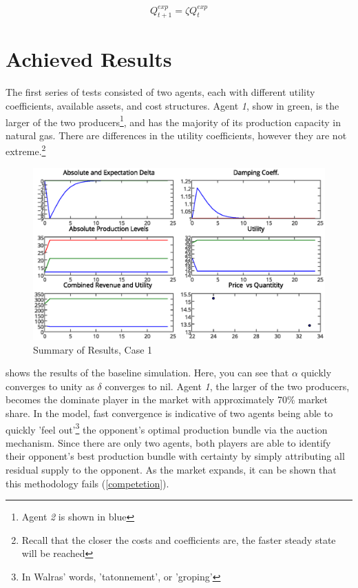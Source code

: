 \documentclass[12pt]{article}
\begin{document}
 	\begin{equation}
 		Q_{t+1}^{exp} = \zeta Q_{t}^{exp}
 	\end{equation}



\section{Achieved Results}
The first series of tests consisted of two agents, each with different utility coefficients, available assets, and cost structures. Agent \emph{1}, show in green, is the larger of the two producers\footnote{Agent \emph{2} is shown in blue}, and has the majority of its production capacity in natural gas. There are differences in the utility coefficients, however they are not extreme.\footnote{Recall that the closer the costs and coefficients are, the faster steady state will be reached}

	\begin{figure}[ht!]
		\begin{center}
		\includegraphics[scale = .75]{2Player.eps}
		\caption{Summary of Results, Case 1}
		\label{results1}
		\end{center}
	\end{figure}

 shows the results of the baseline simulation. Here, you can see that $ \alpha $ quickly converges to unity as $\delta$ converges to nil. Agent \emph{1}, the larger of the two producers, becomes the dominate player in the market with approximately 70\% market share. In the model, fast convergence is indicative of  two agents being able to quickly 'feel out'\footnote{In Walras' words, 'tatonnement', or 'groping'} the opponent's optimal production bundle via the auction mechanism. Since there are only two agents, both players are able to identify their opponent's best production bundle with certainty by simply attributing all residual supply to the opponent. As the market expands, it can be shown that this methodology fails (\cref{competetion}). \*
\end{document}
